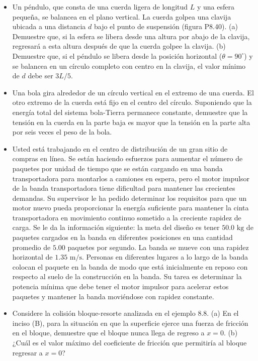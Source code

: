 \documentclass[11pt,a4paper]{article}
\begin{document}
\begin{itemize}
    \item[\textbf{40.}] Un péndulo, que consta de una cuerda ligera de longitud $L$ y una esfera pequeña, se balancea en el plano vertical. La cuerda golpea una clavija ubicada a una distancia $d$ bajo el punto de suspensión (figura P8.40). (a) Demuestre que, si la esfera se libera desde una altura por abajo de la clavija, regresará a esta altura después de que la cuerda golpee la clavija. (b) Demuestre que, si el péndulo se libera desde la posición horizontal ($\theta = 90^\circ$) y se balancea en un círculo completo con centro en la clavija, el valor mínimo de $d$ debe ser $3L/5$.
    \vspace*{7cm}

    \item[\textbf{41.}] Una bola gira alrededor de un círculo vertical en el extremo de una cuerda. El otro extremo de la cuerda está fijo en el centro del círculo. Suponiendo que la energía total del sistema bola-Tierra permanece constante, demuestre que la tensión en la cuerda en la parte baja es mayor que la tensión en la parte alta por seis veces el peso de la bola.
    \vspace*{6cm}

    \item[\textbf{42.}] Usted está trabajando en el centro de distribución de un gran sitio de compras en línea. Se están haciendo esfuerzos para aumentar el número de paquetes por unidad de tiempo que se están cargando en una banda transportadora para montarlos a camiones en espera, pero el motor impulsor de la banda transportadora tiene dificultad para mantener las crecientes demandas. Su supervisor le ha pedido determinar los requisitos para que un motor nuevo pueda proporcionar la energía suficiente para mantener la cinta transportadora en movimiento continuo sometido a la creciente rapidez de carga. Se le da la información siguiente: la meta del diseño es tener $50.0 \text{ kg}$ de paquetes cargados en la banda en diferentes posiciones en una cantidad promedio de $5.00$ paquetes por segundo. La banda se mueve con una rapidez horizontal de $1.35 \text{ m/s}$. Personas en diferentes lugares a lo largo de la banda colocan el paquete en la banda de modo que está inicialmente en reposo con respecto al suelo de la construcción en la banda. Su tarea es determinar la potencia mínima que debe tener el motor impulsor para acelerar estos paquetes y mantener la banda moviéndose con rapidez constante.
    \vspace*{7cm}

    \item[\textbf{43.}] Considere la colisión bloque-resorte analizada en el ejemplo 8.8. (a) En el inciso (B), para la situación en que la superficie ejerce una fuerza de fricción en el bloque, demuestre que el bloque nunca llega de regreso a $x = 0$. (b) ¿Cuál es el valor máximo del coeficiente de fricción que permitiría al bloque regresar a $x = 0$?
    \vspace*{6cm}
\end{itemize}
\end{document}

